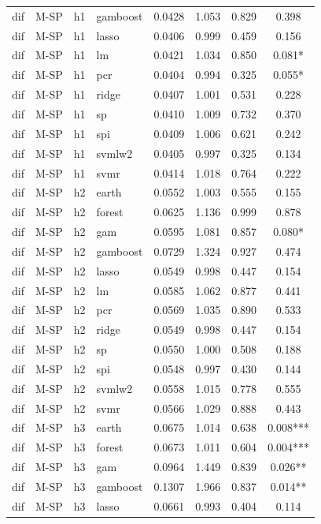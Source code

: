\begin{ThreePartTable}
\begin{longtable}[t]{llclcccc}
dif & M-SP & h1 & gamboost & 0.0428 & 1.053 & 0.829 & 0.398\\
dif & M-SP & h1 & lasso & 0.0406 & 0.999 & 0.459 & 0.156\\
dif & M-SP & h1 & lm & 0.0421 & 1.034 & 0.850 & 0.081*\\
dif & M-SP & h1 & pcr & 0.0404 & 0.994 & 0.325 & 0.055*\\
dif & M-SP & h1 & ridge & 0.0407 & 1.001 & 0.531 & 0.228\\
dif & M-SP & h1 & sp & 0.0410 & 1.009 & 0.732 & 0.370\\
dif & M-SP & h1 & spi & 0.0409 & 1.006 & 0.621 & 0.242\\
dif & M-SP & h1 & svmlw2 & 0.0405 & 0.997 & 0.325 & 0.134\\
dif & M-SP & h1 & svmr & 0.0414 & 1.018 & 0.764 & 0.222\\
\addlinespace
dif & M-SP & h2 & earth & 0.0552 & 1.003 & 0.555 & 0.155\\
dif & M-SP & h2 & forest & 0.0625 & 1.136 & 0.999 & 0.878\\
dif & M-SP & h2 & gam & 0.0595 & 1.081 & 0.857 & 0.080*\\
dif & M-SP & h2 & gamboost & 0.0729 & 1.324 & 0.927 & 0.474\\
dif & M-SP & h2 & lasso & 0.0549 & 0.998 & 0.447 & 0.154\\
dif & M-SP & h2 & lm & 0.0585 & 1.062 & 0.877 & 0.441\\
dif & M-SP & h2 & pcr & 0.0569 & 1.035 & 0.890 & 0.533\\
dif & M-SP & h2 & ridge & 0.0549 & 0.998 & 0.447 & 0.154\\
dif & M-SP & h2 & sp & 0.0550 & 1.000 & 0.508 & 0.188\\
dif & M-SP & h2 & spi & 0.0548 & 0.997 & 0.430 & 0.144\\
dif & M-SP & h2 & svmlw2 & 0.0558 & 1.015 & 0.778 & 0.555\\
dif & M-SP & h2 & svmr & 0.0566 & 1.029 & 0.888 & 0.443\\
\addlinespace
dif & M-SP & h3 & earth & 0.0675 & 1.014 & 0.638 & 0.008***\\
dif & M-SP & h3 & forest & 0.0673 & 1.011 & 0.604 & 0.004***\\
dif & M-SP & h3 & gam & 0.0964 & 1.449 & 0.839 & 0.026**\\
dif & M-SP & h3 & gamboost & 0.1307 & 1.966 & 0.837 & 0.014**\\
dif & M-SP & h3 & lasso & 0.0661 & 0.993 & 0.404 & 0.114\\

\end{longtable}
\end{ThreePartTable}
